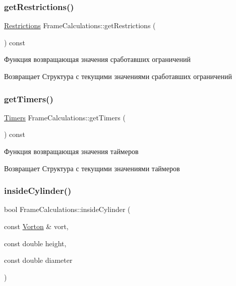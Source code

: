 \subsubsection{\texorpdfstring{get\+Restrictions()}{getRestrictions()}}
{\footnotesize\ttfamily \mbox{\hyperlink{struct_restrictions}{Restrictions}} Frame\+Calculations\+::get\+Restrictions (\begin{DoxyParamCaption}{ }\end{DoxyParamCaption}) const}

Функция возвращающая значения сработавших ограничений \begin{DoxyReturn}{Возвращает}
Структура с текущими значениями сработавших ограничений 
\end{DoxyReturn}
\mbox{\label{class_frame_calculations_ae02bfaca62d087af7c2a84981d3218f9}} 
\subsubsection{\texorpdfstring{get\+Timers()}{getTimers()}}
{\footnotesize\ttfamily \mbox{\hyperlink{struct_timers}{Timers}} Frame\+Calculations\+::get\+Timers (\begin{DoxyParamCaption}{ }\end{DoxyParamCaption}) const}

Функция возвращающая значения таймеров \begin{DoxyReturn}{Возвращает}
Структура с текущими значениями таймеров 
\end{DoxyReturn}
\mbox{\label{class_frame_calculations_a51a235539c794106ae632f2a221c3318}} 
\subsubsection{\texorpdfstring{inside\+Cylinder()}{insideCylinder()}}
{\footnotesize\ttfamily bool Frame\+Calculations\+::inside\+Cylinder (\begin{DoxyParamCaption}\item[{const \mbox{\hyperlink{class_vorton}{Vorton}} \&}]{vort,  }\item[{const double}]{height,  }\item[{const double}]{diameter }\end{DoxyParamCaption})\hspace{0.3cm}{\ttfamily [static]}}

